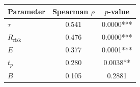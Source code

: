 \begin{tabular}{lcc}
\toprule
Parameter & Spearman $\rho$ & $p$-value \\
\midrule
$\tau$ & 0.541 & 0.0000*** \\
$R_{\mathrm{risk}}$ & 0.476 & 0.0000*** \\
$E$ & 0.377 & 0.0001*** \\
$t_p$ & 0.280 & 0.0038** \\
$B$ & 0.105 & 0.2881 \\
\bottomrule
\end{tabular}
